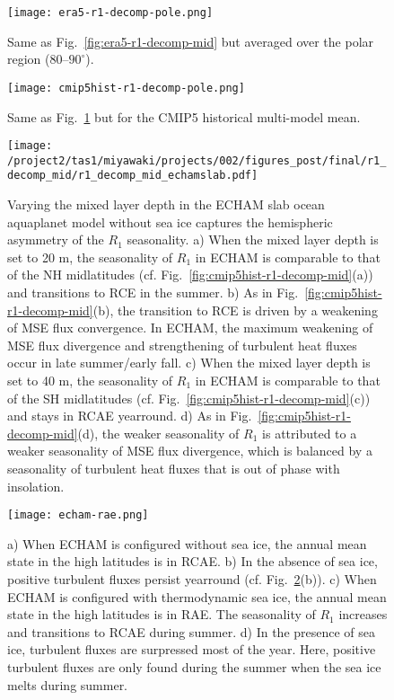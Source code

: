 \documentclass{ametsocV5}
\begin{document}
\begin{figure}[t]
  \noindent\texttt{[image: era5-r1-decomp-pole.png]}\\
  \caption{Same as Fig.~\ref{fig:era5-r1-decomp-mid} but averaged over the polar region ($80$--$90^{\circ}$).}
  \label{fig:era5-r1-decomp-pole}
\end{figure}

\begin{figure}[t]
  \noindent\texttt{[image: cmip5hist-r1-decomp-pole.png]}\\
  \caption{Same as Fig.~\ref{fig:era5-r1-decomp-pole} but for the CMIP5 historical multi-model mean.}
  \label{fig:cmip5hist-r1-decomp-pole}
\end{figure}

\begin{figure}[t]
  \noindent\texttt{[image: /project2/tas1/miyawaki/projects/002/figures\_post/final/r1\_decomp\_mid/r1\_decomp\_mid\_echamslab.pdf]}\\
  \caption{Varying the mixed layer depth in the ECHAM slab ocean aquaplanet model without sea ice captures the hemispheric asymmetry of the \(R_{1}\) seasonality. a) When the mixed layer depth is set to 20 m, the seasonality of \(R_{1}\) in ECHAM is comparable to that of the NH midlatitudes (cf. Fig.~\ref{fig:cmip5hist-r1-decomp-mid}(a)) and transitions to RCE in the summer. b) As in Fig.~\ref{fig:cmip5hist-r1-decomp-mid}(b), the transition to RCE is driven by a weakening of MSE flux convergence. In ECHAM, the maximum weakening of MSE flux divergence and strengthening of turbulent heat fluxes occur in late summer/early fall. c) When the mixed layer depth is set to 40 m, the seasonality of \(R_{1}\) in ECHAM is comparable to that of the SH midlatitudes (cf. Fig.~\ref{fig:cmip5hist-r1-decomp-mid}(c)) and stays in RCAE yearround. d) As in Fig.~\ref{fig:cmip5hist-r1-decomp-mid}(d), the weaker seasonality of \(R_{1}\) is attributed to a weaker seasonality of MSE flux divergence, which is balanced by a seasonality of turbulent heat fluxes that is out of phase with insolation.}
  \label{fig:echam-rce}
\end{figure}

\begin{figure}[t]
  \noindent\texttt{[image: echam-rae.png]}\\
  \caption{a) When ECHAM is configured without sea ice, the annual mean state in the high latitudes is in RCAE. b) In the absence of sea ice, positive turbulent fluxes persist yearround (cf. Fig.~\ref{fig:cmip5hist-r1-decomp-pole}(b)). c) When ECHAM is configured with thermodynamic sea ice, the annual mean state in the high latitudes is in RAE. The seasonality of \(R_{1}\) increases and transitions to RCAE during summer. d) In the presence of sea ice, turbulent fluxes are surpressed most of the year. Here, positive turbulent fluxes are only found during the summer when the sea ice melts during summer.}
  \label{fig:echam-rae}
\end{figure}
\end{document}
